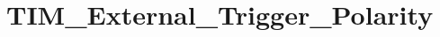 \hypertarget{group___t_i_m___external___trigger___polarity}{\section{T\-I\-M\-\_\-\-External\-\_\-\-Trigger\-\_\-\-Polarity}
\label{group___t_i_m___external___trigger___polarity}
}
